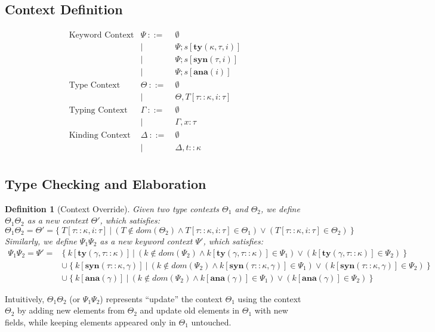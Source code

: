 \documentclass[letterpaper, notitlepage]{article}
\newtheorem{definition}{Definition}
\begin{document}
\subsection{Context Definition}
\[
\begin{array}{rrl}
\text{Keyword Context}	&	\Psi 	~::=&~ 	\emptyset\\
						&			| ~ &~ 	\Psi;s[\mathbf{ty}(\kappa,\tau,i)]\\
						&			| ~ &~ 	\Psi;s[\mathbf{syn}(\tau,i)]\\
						&			| ~ &~ 	\Psi;s[\mathbf{ana}(i)]\\
\text{Type Context}		&	\Theta 	~::=&~ \emptyset\\
						&			| ~ &~ \Theta,T[\tau::\kappa,i:\tau] \\
\text{Typing Context}	&	\Gamma 	~::=&~ \emptyset\\
						&			| ~ &~ \Gamma,x:\tau\\
\text{Kinding Context}	& 	\Delta	~::=&~ \emptyset\\
						& 			| ~ &~ \Delta,t::\kappa\\
\end{array}
\]

\subsection{Type Checking and Elaboration}
\begin{definition}[Context Override]Given two type contexts $\Theta_1$ and $\Theta_2$, we define $\Theta_1\Theta_2$ as a new context $\Theta'$, which satisfies:
\[
	\Theta_1\Theta_2 = \Theta' = \{~T[\tau::\kappa,i:\tau]~|~ (T\notin dom(\Theta_2)\land T[\tau::\kappa,i:\tau]\in\Theta_1)\lor(T[\tau::\kappa,i:\tau]\in\Theta_2) ~\}
\]
Similarly, we define $\Psi_1\Psi_2$ as a new keyword context $\Psi'$, which satisfies:
\[
	\begin{array}{rl}
	\Psi_1\Psi_2=\Psi'=&\{~k[\mathbf{ty}(\gamma,\tau::\kappa)]~|~ (k\notin dom(\Psi_2) \land k[\mathbf{ty}(\gamma,\tau::\kappa)]\in\Psi_1)\lor(k[\mathbf{ty}(\gamma,\tau::\kappa)]\in\Psi_2)  ~\}\\
							 &\cup~\{~k[\mathbf{syn}(\tau::\kappa,\gamma)]~|~ (k\notin dom(\Psi_2) \land k[\mathbf{syn}(\tau::\kappa,\gamma)]\in\Psi_1) \lor(k[\mathbf{syn}(\tau::\kappa,\gamma)]\in\Psi_2)  ~\}\\
							 &\cup~\{~k[\mathbf{ana}(\gamma)]~|~ (k\notin dom(\Psi_2) \land k[\mathbf{ana}(\gamma)]\in\Psi_1) \lor(k[\mathbf{ana}(\gamma)]\in\Psi_2)  ~\}
	\end{array}
\]
\end{definition}
Intuitively, $\Theta_1\Theta_2$ (or $\Psi_1\Psi_2$) represents ``update'' the context $\Theta_1$ using the context $\Theta_2$ by adding new elements from $\Theta_2$ and update old elements in $\Theta_1$ with new fields, while keeping elements appeared only in $\Theta_1$ untouched.
\end{document}
